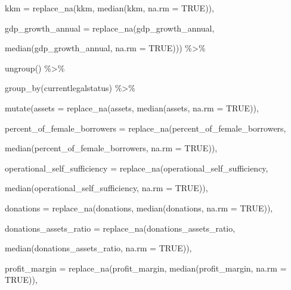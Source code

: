 \documentclass[a4paper,nobind]{templates/ociamthesis}
\newenvironment{Shaded}{\begin{snugshade}}{\end{snugshade}}
\newcommand{\AttributeTok}[1]{\textcolor[rgb]{0.77,0.63,0.00}{#1}}
\newcommand{\ConstantTok}[1]{\textcolor[rgb]{0.00,0.00,0.00}{#1}}
\newcommand{\FunctionTok}[1]{\textcolor[rgb]{0.00,0.00,0.00}{#1}}
\newcommand{\NormalTok}[1]{#1}
\newcommand{\SpecialCharTok}[1]{\textcolor[rgb]{0.00,0.00,0.00}{#1}}
\renewenvironment{Shaded}
{
  \vspace{10pt}%
  \begin{snugshade}%
}{%
  \end{snugshade}%
  \vspace{8pt}%
}
\begin{document}
\begin{Shaded}
\begin{Highlighting}[]
         \AttributeTok{kkm =} \FunctionTok{replace\_na}\NormalTok{(kkm, }\FunctionTok{median}\NormalTok{(kkm, }\AttributeTok{na.rm =} \ConstantTok{TRUE}\NormalTok{)),}
         
         \AttributeTok{gdp\_growth\_annual =} \FunctionTok{replace\_na}\NormalTok{(gdp\_growth\_annual, }
                                        
         \FunctionTok{median}\NormalTok{(gdp\_growth\_annual, }\AttributeTok{na.rm =} \ConstantTok{TRUE}\NormalTok{))) }\SpecialCharTok{\%\textgreater{}\%} 
  
  \FunctionTok{ungroup}\NormalTok{() }\SpecialCharTok{\%\textgreater{}\%} 
  
  \FunctionTok{group\_by}\NormalTok{(currentlegalstatus) }\SpecialCharTok{\%\textgreater{}\%} 
  
  \FunctionTok{mutate}\NormalTok{(}\AttributeTok{assets =} \FunctionTok{replace\_na}\NormalTok{(assets, }\FunctionTok{median}\NormalTok{(assets, }\AttributeTok{na.rm =} \ConstantTok{TRUE}\NormalTok{)), }
         
         \AttributeTok{percent\_of\_female\_borrowers =} \FunctionTok{replace\_na}\NormalTok{(percent\_of\_female\_borrowers, }
                                                  
                        \FunctionTok{median}\NormalTok{(percent\_of\_female\_borrowers, }\AttributeTok{na.rm =} \ConstantTok{TRUE}\NormalTok{)),}
         
         \AttributeTok{operational\_self\_sufficiency =} \FunctionTok{replace\_na}\NormalTok{(operational\_self\_sufficiency, }
                                                   
                        \FunctionTok{median}\NormalTok{(operational\_self\_sufficiency, }\AttributeTok{na.rm =} \ConstantTok{TRUE}\NormalTok{)),}
         
         \AttributeTok{donations =} \FunctionTok{replace\_na}\NormalTok{(donations, }\FunctionTok{median}\NormalTok{(donations, }\AttributeTok{na.rm =} \ConstantTok{TRUE}\NormalTok{)),}
         
         \AttributeTok{donations\_assets\_ratio =} \FunctionTok{replace\_na}\NormalTok{(donations\_assets\_ratio, }
                                             
                                  \FunctionTok{median}\NormalTok{(donations\_assets\_ratio, }\AttributeTok{na.rm =} \ConstantTok{TRUE}\NormalTok{)),}
         
         \AttributeTok{profit\_margin =} \FunctionTok{replace\_na}\NormalTok{(profit\_margin, }\FunctionTok{median}\NormalTok{(profit\_margin, }\AttributeTok{na.rm =} \ConstantTok{TRUE}\NormalTok{)),}
         

\end{Highlighting}
\end{Shaded}
\end{document}
